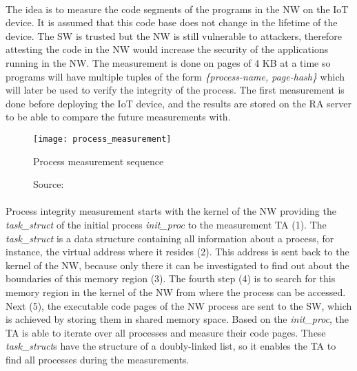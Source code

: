\paragraph*{}
The idea is to measure the code segments of the programs in the NW on the IoT device. It is assumed that this code base does not change in the lifetime of the device. The SW is trusted but the NW is still vulnerable to attackers, therefore attesting the code in the NW would increase the security of the applications running in the NW. The measurement is done on pages of 4 KB at a time so programs will have multiple tuples of the form \textit{\{process-name, page-hash\}} which will later be used to verify the integrity of the process. The first measurement is done before deploying the IoT device, and the results are stored on the RA server to be able to compare the future measurements with. 

\begin{figure}[h]
\centering
\texttt{[image: process\_measurement]}
\caption{Process measurement sequence}
\caption*{Source: \cite{LingZhen2021Sbtb}}
\label{processmeasurement}
\end{figure}

\paragraph*{}
Process integrity measurement starts with the kernel of the NW providing the \textit{task\_struct} of the initial process \textit{init\_proc} to the measurement TA (1). The \textit{task\_struct} is a data structure containing all information about a process, for instance, the virtual address where it resides (2). This address is sent back to the kernel of the NW, because only there it can be investigated to find out about the boundaries of this memory region (3). The fourth step (4) is to search for this memory region in the kernel of the NW from where the process can be accessed. Next (5), the executable code pages of the NW process are sent to the SW, which is achieved by storing them in shared memory space. Based on the \textit{init\_proc}, the TA is able to iterate over all processes and measure their code pages. These \textit{task\_struct}s have the structure of a doubly-linked list, so it enables the TA to find all processes during the measurements. 

